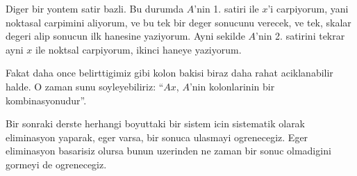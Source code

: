 \documentclass[12pt,fleqn]{article}\usepackage{../common}
\begin{document}
Diger bir yontem satir bazli. Bu durumda $A$'nin 1. satiri ile $x$'i
carpiyorum, yani noktasal carpimini aliyorum, ve bu tek bir deger sonucunu
verecek, ve tek, skalar degeri alip sonucun ilk hanesine yaziyorum. Ayni
sekilde $A$'nin 2. satirini tekrar ayni $x$ ile noktsal carpiyorum, ikinci
haneye yaziyorum. 

Fakat daha once belirttigimiz gibi kolon bakisi biraz daha rahat
aciklanabilir halde. O zaman sunu soyleyebiliriz: ``$Ax$, $A$'nin
kolonlarinin bir kombinasyonudur''. 

Bir sonraki derste herhangi boyuttaki bir sistem icin sistematik olarak
eliminasyon yaparak, eger varsa, bir sonuca ulasmayi ogrenecegiz. Eger
eliminasyon basarisiz olursa bunun uzerinden ne zaman bir sonuc olmadigini
gormeyi de ogrenecegiz. 
\end{document}
